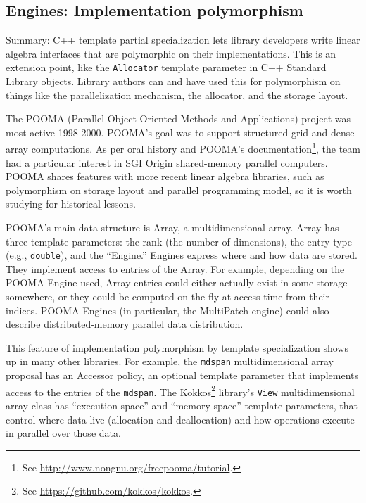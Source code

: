 \subsection{Engines: Implementation polymorphism}
\label{SS:features:engine}

Summary: C++ template partial specialization lets library developers
write linear algebra interfaces that are polymorphic on their
implementations.  This is an extension point, like the
\texttt{Allocator} template parameter in C++ Standard Library objects.
Library authors can and have used this for polymorphism on things like
the parallelization mechanism, the allocator, and the storage layout.

The POOMA (Parallel Object-Oriented Methods and Applications) project
was most active 1998-2000. POOMA's goal was to support structured grid
and dense array computations. As per oral history
\cite{hoemmen2018history} and POOMA's documentation\footnote{See
  \url{http://www.nongnu.org/freepooma/tutorial}.}, the team had a
particular interest in SGI Origin shared-memory parallel
computers. POOMA shares features with more recent linear algebra
libraries, such as polymorphism on storage layout and parallel
programming model, so it is worth studying for historical lessons.

POOMA's main data structure is Array, a multidimensional array. Array
has three template parameters: the rank (the number of dimensions),
the entry type (e.g., \texttt{double}), and the ``Engine.''  Engines
express where and how data are stored.  They implement access to
entries of the Array.  For example, depending on the POOMA Engine
used, Array entries could either actually exist in some storage
somewhere, or they could be computed on the fly at access time from
their indices.  POOMA Engines (in particular, the MultiPatch engine)
could also describe distributed-memory parallel data distribution.

This feature of implementation polymorphism by template specialization
shows up in many other libraries.  For example, the \texttt{mdspan}
multidimensional array proposal \cite{P0009r8} has an Accessor policy,
an optional template parameter that implements access to the entries
of the \texttt{mdspan}.  The Kokkos\footnote{See
  \url{https://github.com/kokkos/kokkos}.} library's \texttt{View}
multidimensional array class has ``execution space'' and ``memory
space'' template parameters, that control where data live (allocation
and deallocation) and how operations execute in parallel over those
data.

